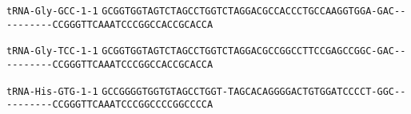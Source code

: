 \documentclass{article}
\newcommand{\rnabox}[1]{\colorbox{#1}{\texttt{#1}}}
\begin{document}
\vspace{-0.5mm}

\texttt{tRNA-Gly-GCC-1-1}
\rnabox{G}\rnabox{C}\rnabox{G}\rnabox{G}\rnabox{T}\rnabox{G}\rnabox{G}\rnabox{T}\rnabox{A}\rnabox{G}\rnabox{T}\rnabox{C}\rnabox{T}\rnabox{A}\rnabox{G}\rnabox{C}\rnabox{C}\rnabox{T}\rnabox{G}\rnabox{G}\rnabox{T}\rnabox{C}\rnabox{T}\rnabox{A}\rnabox{G}\rnabox{G}\rnabox{A}\rnabox{C}\rnabox{G}\rnabox{C}\rnabox{C}\rnabox{A}\rnabox{C}\rnabox{C}\rnabox{C}\rnabox{T}\rnabox{G}\rnabox{C}\rnabox{C}\rnabox{A}\rnabox{A}\rnabox{G}\rnabox{G}\rnabox{T}\rnabox{G}\rnabox{G}\rnabox{A}\rnabox{-}\rnabox{G}\rnabox{A}\rnabox{C}\rnabox{-}\rnabox{-}\rnabox{-}\rnabox{-}\rnabox{-}\rnabox{-}\rnabox{-}\rnabox{-}\rnabox{-}\rnabox{-}\rnabox{C}\rnabox{C}\rnabox{G}\rnabox{G}\rnabox{G}\rnabox{T}\rnabox{T}\rnabox{C}\rnabox{A}\rnabox{A}\rnabox{A}\rnabox{T}\rnabox{C}\rnabox{C}\rnabox{C}\rnabox{G}\rnabox{G}\rnabox{C}\rnabox{C}\rnabox{A}\rnabox{C}\rnabox{C}\rnabox{G}\rnabox{C}\rnabox{A}\rnabox{C}\rnabox{C}\rnabox{A}

\vspace{-0.5mm}

\texttt{tRNA-Gly-TCC-1-1}
\rnabox{G}\rnabox{C}\rnabox{G}\rnabox{G}\rnabox{T}\rnabox{G}\rnabox{G}\rnabox{T}\rnabox{A}\rnabox{G}\rnabox{T}\rnabox{C}\rnabox{T}\rnabox{A}\rnabox{G}\rnabox{C}\rnabox{C}\rnabox{T}\rnabox{G}\rnabox{G}\rnabox{T}\rnabox{C}\rnabox{T}\rnabox{A}\rnabox{G}\rnabox{G}\rnabox{A}\rnabox{C}\rnabox{G}\rnabox{C}\rnabox{C}\rnabox{G}\rnabox{G}\rnabox{C}\rnabox{C}\rnabox{T}\rnabox{T}\rnabox{C}\rnabox{C}\rnabox{G}\rnabox{A}\rnabox{G}\rnabox{C}\rnabox{C}\rnabox{G}\rnabox{G}\rnabox{C}\rnabox{-}\rnabox{G}\rnabox{A}\rnabox{C}\rnabox{-}\rnabox{-}\rnabox{-}\rnabox{-}\rnabox{-}\rnabox{-}\rnabox{-}\rnabox{-}\rnabox{-}\rnabox{-}\rnabox{C}\rnabox{C}\rnabox{G}\rnabox{G}\rnabox{G}\rnabox{T}\rnabox{T}\rnabox{C}\rnabox{A}\rnabox{A}\rnabox{A}\rnabox{T}\rnabox{C}\rnabox{C}\rnabox{C}\rnabox{G}\rnabox{G}\rnabox{C}\rnabox{C}\rnabox{A}\rnabox{C}\rnabox{C}\rnabox{G}\rnabox{C}\rnabox{A}\rnabox{C}\rnabox{C}\rnabox{A}

\vspace{-0.5mm}

\texttt{tRNA-His-GTG-1-1}
\rnabox{G}\rnabox{C}\rnabox{C}\rnabox{G}\rnabox{G}\rnabox{G}\rnabox{G}\rnabox{T}\rnabox{G}\rnabox{G}\rnabox{T}\rnabox{G}\rnabox{T}\rnabox{A}\rnabox{G}\rnabox{C}\rnabox{C}\rnabox{T}\rnabox{G}\rnabox{G}\rnabox{T}\rnabox{-}\rnabox{T}\rnabox{A}\rnabox{G}\rnabox{C}\rnabox{A}\rnabox{C}\rnabox{A}\rnabox{G}\rnabox{G}\rnabox{G}\rnabox{G}\rnabox{A}\rnabox{C}\rnabox{T}\rnabox{G}\rnabox{T}\rnabox{G}\rnabox{G}\rnabox{A}\rnabox{T}\rnabox{C}\rnabox{C}\rnabox{C}\rnabox{C}\rnabox{T}\rnabox{-}\rnabox{G}\rnabox{G}\rnabox{C}\rnabox{-}\rnabox{-}\rnabox{-}\rnabox{-}\rnabox{-}\rnabox{-}\rnabox{-}\rnabox{-}\rnabox{-}\rnabox{-}\rnabox{C}\rnabox{C}\rnabox{G}\rnabox{G}\rnabox{G}\rnabox{T}\rnabox{T}\rnabox{C}\rnabox{A}\rnabox{A}\rnabox{A}\rnabox{T}\rnabox{C}\rnabox{C}\rnabox{C}\rnabox{G}\rnabox{G}\rnabox{C}\rnabox{C}\rnabox{C}\rnabox{C}\rnabox{G}\rnabox{G}\rnabox{C}\rnabox{C}\rnabox{C}\rnabox{C}\rnabox{A}
\end{document}

